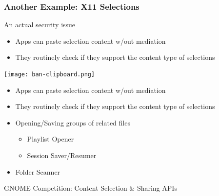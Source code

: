 

\begin{frame}
\frametitle{Another Example: X11 Selections}

	\begin{block}{An actual security issue}
	\begin{itemize}
	\item Apps can paste selection content w/out mediation
	\item They routinely check if they support the content type of selections
	\end{itemize}
	\end{block}

	\begin{center}
	\texttt{[image: ban-clipboard.png]}
	\end{center}

  \begin{block}{}
  \begin{itemize}
  \item Apps can paste selection content w/out mediation
  \item They routinely check if they support the content type of selections
  \item Opening/Saving groups of related files
    \begin{itemize}
    \item Playlist Opener
    \item Session Saver/Resumer
    \end{itemize}
  \item Folder Scanner
  \end{itemize}
  \end{block}
  
  \begin{important}
    GNOME Competition: Content Selection \& Sharing APIs
  \end{important}
\end{frame}


